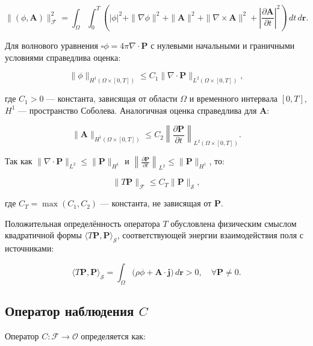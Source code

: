\documentclass[a4paper,14pt,oneside,openany]{extarticle}
\begin{document}
\begin{equation}
    \|(\phi, \mathbf{A})\|_{\mathcal{F}}^2 = \int_\Omega \int_0^T \left( |\phi|^2 + \|\nabla \phi\|^2 + \|\mathbf{A}\|^2 + \|\nabla \times \mathbf{A}\|^2 + \left|\frac{\partial \mathbf{A}}{\partial t}\right|^2 \right) \, dt \, d\mathbf{r}.
\end{equation}

Для волнового уравнения $\square \phi = 4\pi \nabla \cdot \mathbf{P}$ с нулевыми начальными и граничными условиями справедлива оценка:

\begin{equation}
    \|\phi\|_{H^1(\Omega \times [0,T])} \leq C_1 \|\nabla \cdot \mathbf{P}\|_{L^2(\Omega \times [0,T])},
\end{equation}

где $C_1 > 0$ --- константа, зависящая от области $\Omega$ и временного интервала $[0,T]$, $H^1$ --- пространство Соболева. Аналогичная оценка справедлива для $\mathbf{A}$:

\begin{equation}
    \|\mathbf{A}\|_{H^1(\Omega \times [0,T])} \leq C_2 \left\|\frac{\partial \mathbf{P}}{\partial t}\right\|_{L^2(\Omega \times [0,T])}.
\end{equation}

Так как $\|\nabla \cdot \mathbf{P}\|_{L^2} \leq \|\mathbf{P}\|_{H^1}$ и $\left\|\frac{\partial \mathbf{P}}{\partial t}\right\|_{L^2} \leq \|\mathbf{P}\|_{H^1}$, то:

\begin{equation}
    \|T\mathbf{P}\|_{\mathcal{F}} \leq C_T \|\mathbf{P}\|_{\mathcal{S}},
\end{equation}

где $C_T = \max(C_1, C_2)$ --- константа, не зависящая от $\mathbf{P}$.

Положительная определённость оператора $T$ обусловлена физическим смыслом квадратичной формы $\langle T\mathbf{P}, \mathbf{P} \rangle_{\mathcal{S}}$, соответствующей энергии взаимодействия поля с источниками:

\begin{equation}
    \langle T\mathbf{P}, \mathbf{P} \rangle_{\mathcal{S}} = \int_\Omega \bigl(\rho \phi + \mathbf{A} \cdot \mathbf{j}\bigr) \, d\mathbf{r} > 0, \quad \forall \mathbf{P} \neq 0.
\end{equation}

\subsection{Оператор наблюдения $C$}
Оператор $C: \mathcal{F} \to \mathcal{O}$ определяется как:
\end{document}
